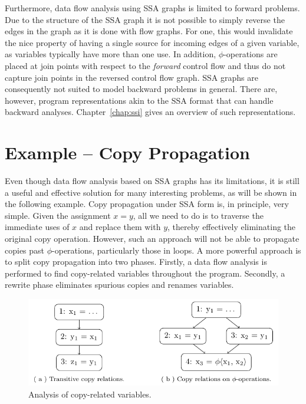 Furthermore, data flow analysis using SSA graphs is limited to forward problems.
Due to the structure of the SSA graph it is not possible to simply reverse the
edges in the graph as it is done with flow graphs. For one, this would
invalidate the nice property of having a single source for incoming edges of a
given variable, as variables typically have more than one use. In addition,
$\phi$-operations are placed at join points with respect to the \emph{forward}
control flow and thus do not capture join points in the reversed control flow
graph.
SSA graphs are consequently not suited to model backward problems in general.
There are, however, program representations akin to the SSA format that can
handle backward analyses.
Chapter~\ref{chap:ssi} gives an overview of such representations.

\section{Example -- Copy Propagation}
\label{novillo:sec:example}

Even though data flow analysis based on SSA graphs has its limitations, it is
still a useful and effective solution for many interesting problems, as will be
shown in the following example.
Copy propagation under SSA form is, in principle, very simple.  Given the
assignment $x = y$, all we need to do is to traverse the immediate
uses of $x$ and replace them with $y$, thereby effectively eliminating the
original copy operation. However, such an approach will not be able to propagate
copies past \linebreak $\phi$-operations, particularly those in loops. A more powerful
approach is to split copy propagation into two phases. Firstly, a data flow
analysis is performed to find copy-related variables throughout the program.
Secondly, a rewrite phase eliminates spurious copies and renames variables.

\begin{figure}[t!]
  \begin{center}
    \includegraphics{copy_propagation}
    \subfloat{\label{novillo:fig:copy_propagation:a}}
    \subfloat{\label{novillo:fig:copy_propagation:b}}
  \end{center}
  \vspace{-1em}
  \caption{Analysis of copy-related variables.}
  \label{novillo:fig:copy_propagation}
\end{figure}

